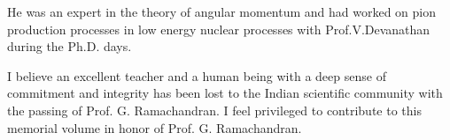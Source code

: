 He was an expert in the theory of angular momentum and had worked on pion production processes in low energy nuclear processes with Prof.V.Devanathan during the Ph.D. days. 

I believe an excellent teacher and a human being with a deep sense of commitment and integrity has been lost to the Indian scientific community with the passing of Prof. G. Ramachandran. I feel privileged to contribute to this memorial volume in honor of Prof. G. Ramachandran.
